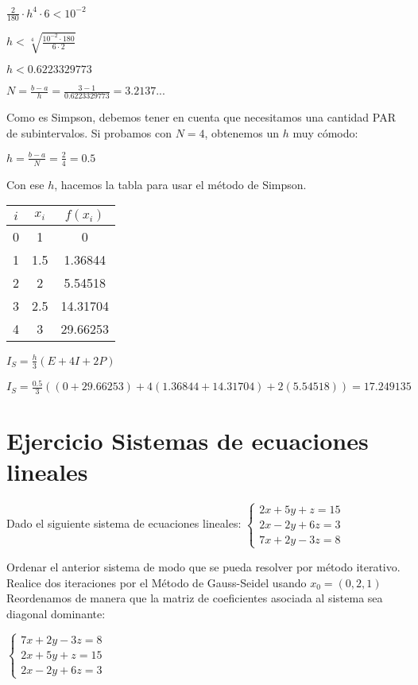 \documentclass[11pt]{article}
\begin{document}
	$\displaystyle \frac{2}{180} \cdot h^4 \cdot 6 < 10^{-2}$
	
	$\displaystyle h < \sqrt[4]{\frac{10^{-2}\cdot 180}{6\cdot2}}$
	
	$h < 0.6223329773$
	
	$\displaystyle N=\frac{b-a}{h}=\frac{3-1}{0.6223329773}=3.2137...$
	
	Como es Simpson, debemos tener en cuenta que necesitamos una cantidad PAR de subintervalos. Si probamos con $N=4$, obtenemos un $h$ muy cómodo:
	
	$\displaystyle h=\frac{b-a}{N}=\frac{2}{4}=\boxed{0.5}$
	
	Con ese $h$, hacemos la tabla para usar el método de Simpson.
	
	\begin{tabular}{|c|c|c|}
		\hline
		$i$ & $x_i$ & $f(x_i)$\\
		\hline
		0 & 1 & 0\\
		\hline
		1 & 1.5 & 1.36844\\
		\hline
		2 & 2 & 5.54518\\
		\hline
		3 & 2.5 & 14.31704\\
		\hline
		4 & 3 & 29.66253\\
		\hline
	\end{tabular}

	$\displaystyle I_S=\frac{h}{3}(E+4I+2P)$
	
	$\displaystyle I_S=\frac{0.5}{3}((0+29.66253)+4(1.36844+14.31704)+2(5.54518))=\boxed{17.249135}$
	
	\section{Ejercicio Sistemas de ecuaciones lineales}
	Dado el siguiente sistema de ecuaciones lineales:
	$\begin{cases}
		2x+5y+z=15\\
		2x-2y+6z=3\\
		7x+2y-3z=8
	\end{cases}$

	Ordenar el anterior sistema de modo que se pueda resolver por método iterativo. Realice dos iteraciones por el Método de Gauss-Seidel usando $x_0=(0,2,1)$\\
	
	Reordenamos de manera que la matriz de coeficientes asociada al sistema sea diagonal dominante:
	
	$\begin{cases}
		7x+2y-3z=8\\
		2x+5y+z=15\\
		2x-2y+6z=3
	\end{cases}$
\end{document}
